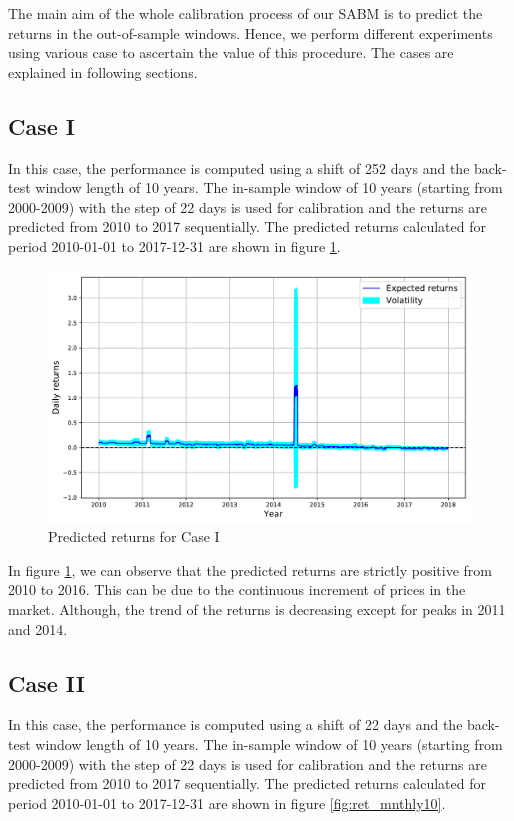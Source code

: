 The main aim of the whole calibration process of our SABM is to predict the returns in the out-of-sample windows. Hence, we perform different experiments using various case to ascertain the value of this procedure. The cases are explained in following sections.


\subsection{Case I}
In this case, the performance is computed using a shift of 252 days and the back-test window length of 10 years. The in-sample window of 10 years (starting from 2000-2009) with the step of 22 days is used for calibration and the returns are predicted from 2010 to 2017 sequentially. The predicted returns calculated for period 2010-01-01 to 2017-12-31 are shown in figure \ref{fig:ret_yrly}.

\begin{figure}[h!] 
\centering
 \includegraphics[width=0.75\linewidth]{figures/exp_ret_yearly.pdf}
\caption{Predicted returns for Case I}
\label{fig:ret_yrly}
\end{figure}  

In figure \ref{fig:ret_yrly}, we can observe that the predicted returns are strictly positive from 2010 to 2016. This can be due to the continuous increment of prices in the market. Although, the trend of the returns is decreasing except for peaks in 2011 and 2014. 


\subsection{Case II}
In this case, the performance is computed using a shift of 22 days and the back-test window length of 10 years. The in-sample window of 10 years (starting from 2000-2009) with the step of 22 days is used for calibration and the returns are predicted from 2010 to 2017 sequentially. The predicted returns calculated for period 2010-01-01 to 2017-12-31 are shown in figure \ref{fig:ret_mnthly10}.

